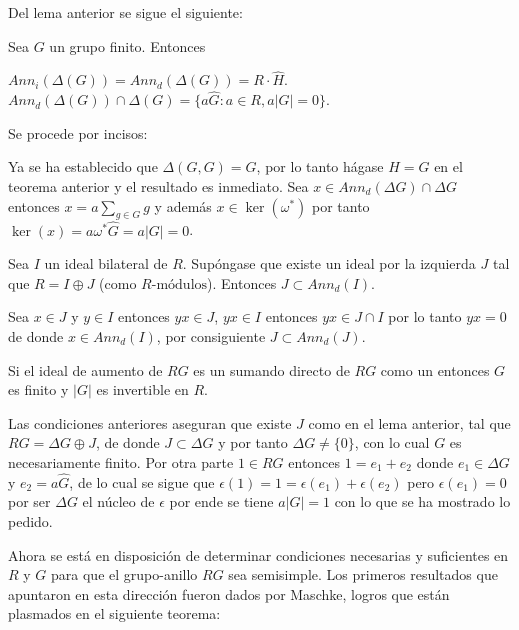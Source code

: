 Del lema anterior se sigue el siguiente:

\begin{corolario}
Sea $G$ un grupo finito. Entonces 

\begin{bulletList}
\newItem $Ann_i (\Delta(G)) = Ann_d(\Delta(G)) = R\cdot \hat{H}$.
\newItem $Ann_d(\Delta(G)) \cap \Delta (G) = \{ a\hat{G} : a \in R , a|G| = 0\}$.
\end{bulletList}
\end{corolario}


\begin{proof*}
Se procede por incisos:
\begin{bulletList}
\newItem Ya se ha establecido que $\Delta(G,G) = G$, por lo tanto hágase $H=G$ en el teorema anterior y el resultado es inmediato.
\newItem Sea $x \in Ann_d(\Delta G) \cap \Delta G$ entonces $x = a\sum_{g\in G}g$ y además $x \in \ker(\omega^*)$ por tanto $\ker(x)= a\omega^*\hat{G} = a|G| = 0 $. \qedhere
\end{bulletList}
\end{proof*}
\begin{lema}
Sea $I$ un ideal bilateral de $R$. Supóngase que existe un ideal por la izquierda $J$ tal que $R = I \oplus J$ (como $R\mbox{-módulos}$). Entonces $J \subset Ann_d(I) $.
\end{lema}
\begin{proof*}
Sea $x \in J$ y $y \in I $ entonces $yx \in J$, $yx \in I$ entonces $yx \in J\cap I$ por lo tanto $yx=0$ de donde $x \in Ann_d(I)$, por consiguiente $J \subset Ann_d(J)$. \qedhere 
\end{proof*}
\begin{lema}\label{aumento}
Si el ideal de aumento de $RG$ es un sumando directo de $RG$ como un  entonces $G$ es finito y $|G|$ es invertible en $R$.
\end{lema}
\begin{proof*}
Las condiciones anteriores aseguran que existe $J$ como en el lema anterior, tal que $RG = \Delta G \oplus J$, de donde $J \subset \Delta G$  y por tanto $\Delta G \neq \{ 0 \}$, con lo cual $G$ es necesariamente finito.
Por otra parte $1 \in RG$ entonces $1 = e_1 + e_2$ donde $e_1 \in \Delta G$ y $e_2=a\hat{G}$, de lo cual se sigue que $\epsilon(1) = 1 = \epsilon(e_1) + \epsilon(e_2)$ pero $\epsilon(e_1) = 0$ por ser $\Delta G$ el núcleo de $\epsilon$ por ende se tiene $a|G| = 1$ con lo que se ha mostrado lo pedido. \qedhere
\end{proof*}
Ahora se está en disposición de determinar condiciones necesarias y suficientes en $R$ y $G$ para que el grupo-anillo $RG$ sea semisimple. Los primeros resultados que apuntaron en esta dirección fueron dados por Maschke, logros que están plasmados en el siguiente teorema:
